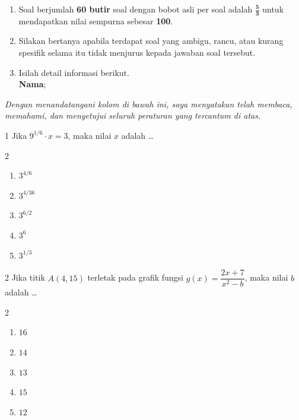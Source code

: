 \documentclass[11pt]{article}
\newenvironment{pilB}{%
  \par\smallskip\begin{multicols}{2}
  \begin{enumerate}[label=(\Alph*),leftmargin=*,itemsep=1pt,topsep=3pt]}%
  {\end{enumerate}\end{multicols}}
\begin{document}
\begin{enumerate}[leftmargin=*,itemsep=4pt,topsep=4pt]
  \item Soal berjumlah \textbf{60 butir} soal dengan bobot asli per soal adalah
        $\mathbf{\tfrac{5}{3}}$ untuk mendapatkan nilai sempurna sebesar \textbf{100}.

  \item Silakan bertanya apabila terdapat soal yang ambigu, rancu, atau kurang
        spesifik selama itu tidak menjurus kepada jawaban soal tersebut.

  \item Isilah detail informasi berikut.\\[0.3em]
        \textbf{Nama}\hspace{0.45cm};\enspace\underline{\hspace{8cm}}
\end{enumerate}

\vspace{0.6cm}
\noindent\textit{Dengan menandatangani kolom di bawah ini, saya menyatakan telah membaca,
memahami, dan menyetujui seluruh peraturan yang tercantum di atas.}

\vspace{0.6cm}
\noindent{}

\clearpage


\begin{soal}{1}
Jika $9^{1/6}\cdot x=3$, maka nilai $x$ adalah \ldots
\begin{pilB}
  \item $3^{4/6}$ \item $3^{4/36}$ \item $3^{6/2}$ \item $3^{6}$ \item $3^{1/3}$
\end{pilB}
\end{soal}

\begin{soal}{2}
Jika titik $A(4,15)$ terletak pada grafik fungsi $g(x)=\dfrac{2x+7}{x^2-b}$,
maka nilai $b$ adalah \ldots
\begin{pilB}
  \item $16$ \item $14$ \item $13$ \item $15$ \item $12$
\end{pilB}
\end{soal}
\end{document}

